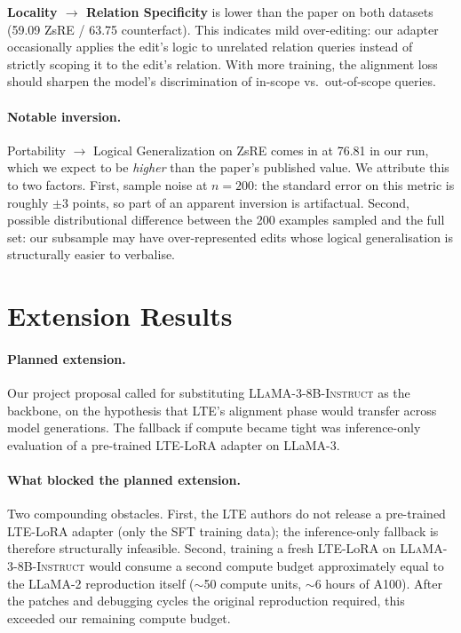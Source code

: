\documentclass[11pt,a4paper,twocolumn]{article}
\begin{document}
\textbf{Locality $\rightarrow$ Relation Specificity} is lower than the paper on both datasets (59.09 ZsRE / 63.75 counterfact). This indicates mild over-editing: our adapter occasionally applies the edit's logic to unrelated relation queries instead of strictly scoping it to the edit's relation. With more training, the alignment loss should sharpen the model's discrimination of in-scope vs.~out-of-scope queries.

\paragraph{Notable inversion.} Portability $\rightarrow$ Logical Generalization on ZsRE comes in at 76.81 in our run, which we expect to be \emph{higher} than the paper's published value. We attribute this to two factors. First, sample noise at $n=200$: the standard error on this metric is roughly $\pm 3$ points, so part of an apparent inversion is artifactual. Second, possible distributional difference between the 200 examples sampled and the full set: our subsample may have over-represented edits whose logical generalisation is structurally easier to verbalise.

\section{Extension Results}
\label{sec:extension}

\paragraph{Planned extension.} Our project proposal called for substituting \textsc{LLaMA-3-8B-Instruct} as the backbone, on the hypothesis that LTE's alignment phase would transfer across model generations. The fallback if compute became tight was inference-only evaluation of a pre-trained LTE-LoRA adapter on LLaMA-3.

\paragraph{What blocked the planned extension.} Two compounding obstacles. First, the LTE authors do not release a pre-trained LTE-LoRA adapter (only the SFT training data); the inference-only fallback is therefore structurally infeasible. Second, training a fresh LTE-LoRA on \textsc{LLaMA-3-8B-Instruct} would consume a second compute budget approximately equal to the LLaMA-2 reproduction itself ($\sim$50 compute units, $\sim$6 hours of A100). After the patches and debugging cycles the original reproduction required, this exceeded our remaining compute budget.
\end{document}
